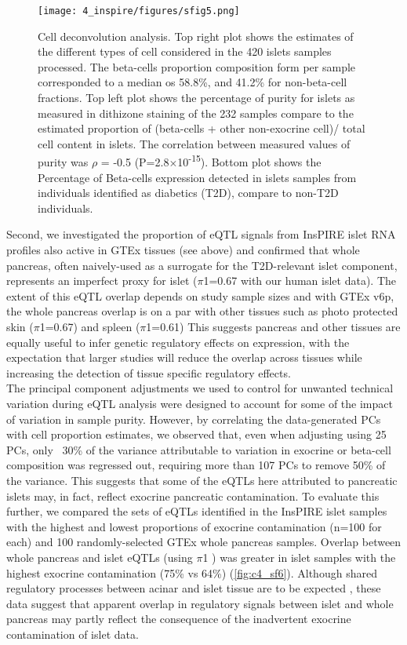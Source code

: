 \begin{figure}
    \centering
    \texttt{[image: 4\_inspire/figures/sfig5.png]}
    \caption[Cell deconvolution anlaysis]{Cell deconvolution analysis. Top right plot shows the estimates of the different types of cell considered in the 420 islets samples processed. The beta-cells proportion composition form per sample corresponded to a median os 58.8\%, and 41.2\% for non-beta-cell fractions. Top left plot shows the percentage of purity for islets as measured in dithizone staining of the 232 samples compare to the estimated proportion of (beta-cells +  other non-exocrine cell)/ total cell content in islets. The correlation between measured values of purity was $\rho$ = -0.5 (P=2.8$\times$10\textsuperscript{-15}). Bottom plot shows the Percentage of Beta-cells expression detected in islets samples from individuals identified as diabetics (T2D), compare to non-T2D individuals.}
    \label{fig:c4_sf5}
  \end{figure}
  
Second, we investigated the proportion of eQTL signals from InsPIRE islet RNA profiles also active in GTEx tissues (see above) and confirmed that whole pancreas, often naively-used as a surrogate for the T2D-relevant islet component, represents an imperfect proxy for islet ($\pi$1=0.67 with our human islet data). The extent of this eQTL overlap depends on study sample sizes and with GTEx v6p, the whole pancreas overlap is on a par with other tissues such as photo protected skin ($\pi$1=0.67) and spleen ($\pi$1=0.61) This suggests pancreas and other tissues are equally useful to infer genetic regulatory effects on expression, with the expectation that larger studies will reduce the overlap across tissues while increasing the detection of tissue specific regulatory effects. \\
      
The principal component adjustments we used to control for unwanted technical variation during eQTL analysis were designed to account for some of the impact of variation in sample purity. However, by correlating the data-generated PCs with cell proportion estimates, we observed that, even when adjusting using 25 PCs, only ~30\% of the variance attributable to variation in exocrine or beta-cell composition was regressed out, requiring more than 107 PCs to remove 50\% of the variance. This suggests that some of the eQTLs here attributed to pancreatic islets may, in fact, reflect exocrine pancreatic contamination. To evaluate this further, we compared the sets of eQTLs identified in the InsPIRE islet samples with the highest and lowest proportions of exocrine contamination (n=100 for each) and 100 randomly-selected GTEx whole pancreas samples. Overlap between whole pancreas and islet eQTLs (using $\pi$1 \cite{storeyDirectApproachFalse2002}) was greater in islet samples with the highest exocrine contamination (75\% vs 64\%) (\ref{fig:c4_sf6}). Although shared regulatory processes between acinar and islet tissue are to be expected \cite{solimenaSystemsBiologyIMIDIA2018}, these data suggest that apparent overlap in regulatory signals between islet and whole pancreas may partly reflect the consequence of the inadvertent exocrine contamination of islet data. 

